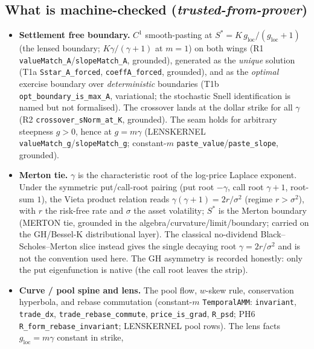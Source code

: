 \documentclass[11pt]{article}
\newcommand{\tfp}{\emph{trusted-from-prover}}
\begin{document}
\subsection{What is machine-checked (\tfp{})}
\begin{itemize}[leftmargin=2em]
  \item \textbf{Settlement free boundary.} $C^{1}$ smooth-pasting at
        $S^{\ast}=K\,g_{\mathrm{loc}}/(g_{\mathrm{loc}}+1)$ (the lensed boundary;
        $K\gamma/(\gamma+1)$ at $m=1$) on both wings (R1
        \texttt{valueMatch\_A}/\texttt{slopeMatch\_A}, grounded), generated as the
        \emph{unique} solution (T1a \texttt{Sstar\_A\_forced},
        \texttt{coeffA\_forced}, grounded), and as the \emph{optimal} exercise
        boundary over \emph{deterministic} boundaries (T1b \texttt{opt\_boundary\_is\_max\_A}, variational; the
        stochastic Snell identification is named but not formalised). The crossover lands at the dollar strike for all
        $\gamma$ (R2 \texttt{crossover\_sNorm\_at\_K}, grounded). The seam holds
        for arbitrary steepness $g>0$, hence at $g=m\gamma$ (LENSKERNEL
        \texttt{valueMatch\_g}/\texttt{slopeMatch\_g}; constant-$m$
        \texttt{paste\_value}/\texttt{paste\_slope}, grounded).
  \item \textbf{Merton tie.} $\gamma$ is the characteristic root of the log-price
        Laplace exponent. Under the symmetric put/call-root pairing (put root
        $-\gamma$, call root $\gamma+1$, root-sum $1$), the Vieta product relation
        reads $\gamma(\gamma+1)=2r/\sigma^{2}$ (regime $r>\sigma^{2}$), with $r$
        the risk-free rate and $\sigma$ the asset volatility; $S^{\ast}$ is the
        Merton boundary (MERTON tie, grounded in the
        algebra/curvature/limit/boundary; carried on the GH/Bessel-K
        distributional layer). The classical no-dividend Black--Scholes--Merton
        slice instead gives the single decaying root $\gamma=2r/\sigma^{2}$ and is
        not the convention used here. The GH asymmetry is recorded honestly: only
        the put eigenfunction is native (the call root leaves the strip).
  \item \textbf{Curve / pool spine and lens.} The pool flow, $w$-skew rule,
        conservation hyperbola, and rebase commutation (constant-$m$
        \texttt{TemporalAMM}: \texttt{invariant}, \texttt{trade\_dx},
        \texttt{trade\_rebase\_commute}, \texttt{price\_is\_grad},
        \texttt{R\_psd}; PH6 \texttt{R\_form\_rebase\_invariant}; LENSKERNEL pool
        rows). The lens facts $g_{\mathrm{loc}}=m\gamma$ constant in strike,

\end{itemize}
\end{document}
